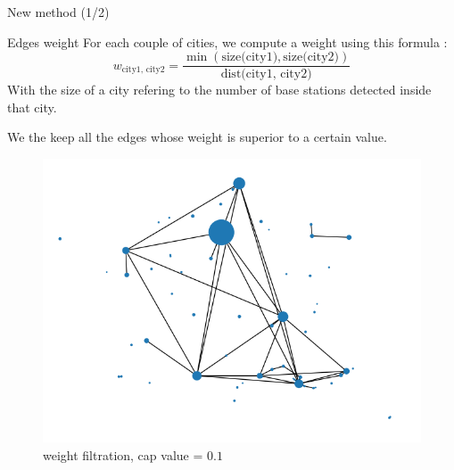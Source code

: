 \begin{frame}{New method (1/2)}
    \begin{block}{Edges weight}
        For each couple of cities, we compute a weight using this formula :
        $$w_{\text{city1, city2}} = \frac{\min(\text{size(city1)},\text{size(city2)})}{\text{dist(city1, city2)}}$$
        With the size of a city refering to the number of base stations detected inside that city.
        
        We the keep all the edges whose weight is superior to a certain value.
    \end{block}

    \begin{figure}
        \includegraphics[height=0.3\paperheight]{images/road_detection/edges_weight_filtration.png}
        \caption{weight filtration, cap value = $0.1$}
    \end{figure}
\end{frame} 

